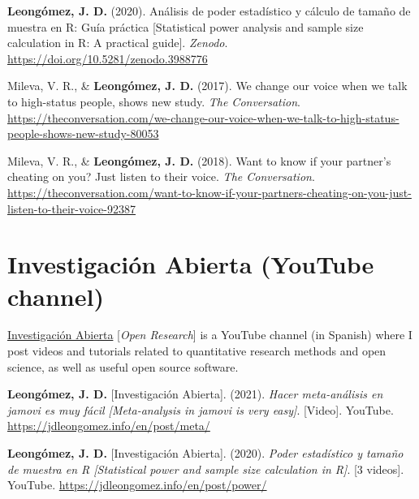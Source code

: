 \documentclass[11pt,a4paper,]{awesome-cv}
\begin{document}
\leavevmode{}%
\textbf{Leongómez, J. D.} (2020). {Análisis de poder estadístico y
cálculo de tamaño de muestra en R: Guía práctica {[}Statistical power
analysis and sample size calculation in R: A practical guide{]}}.
\emph{Zenodo}. \url{https://doi.org/10.5281/zenodo.3988776}

\leavevmode{}%
Mileva, V. R., \& \textbf{Leongómez, J. D.} (2017). {We change our voice
when we talk to high-status people, shows new study}. \emph{The
Conversation}.
\url{https://theconversation.com/we-change-our-voice-when-we-talk-to-high-status-people-shows-new-study-80053}

\leavevmode{}%
Mileva, V. R., \& \textbf{Leongómez, J. D.} (2018). {Want to know if
your partner's cheating on you? Just listen to their voice}. \emph{The
Conversation}.
\url{https://theconversation.com/want-to-know-if-your-partners-cheating-on-you-just-listen-to-their-voice-92387}

\endgroup

\hypertarget{investigaciuxf3n-abierta-youtube-channel}{%
\section{Investigación Abierta (YouTube
channel)}\label{investigaciuxf3n-abierta-youtube-channel}}

\href{https://www.youtube.com/@InvestigacionAbierta}{\textcolor{red}{\faYoutubePlay}
Investigación Abierta} {[}\textit{Open Research}{]} is a YouTube channel
(in Spanish) where I post videos and tutorials related to quantitative
research methods and open science, as well as useful open source
software.

\begingroup
\setlength{\parindent}{-0.5in}
\setlength{\leftskip}{0.5in}

\hypertarget{refs_IA}{}
\leavevmode{}%
\textbf{Leongómez, J. D.} {[}Investigación Abierta{]}. (2021).
\emph{{Hacer meta-análisis en jamovi es muy fácil {[}Meta-analysis in
jamovi is very easy{]}}}. {[}Video{]}. YouTube.
\url{https://jdleongomez.info/en/post/meta/}

\leavevmode{}%
\textbf{Leongómez, J. D.} {[}Investigación Abierta{]}. (2020).
\emph{{Poder estadístico y tamaño de muestra en R {[}Statistical power
and sample size calculation in R{]}}}. {[}3 videos{]}. YouTube.
\url{https://jdleongomez.info/en/post/power/}
\end{document}
